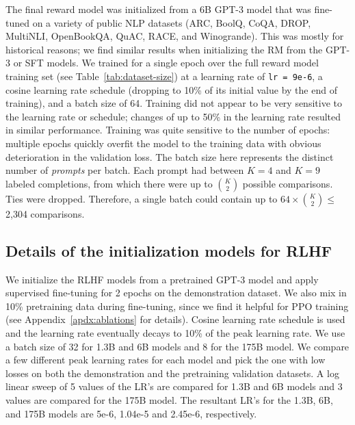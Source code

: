 The final reward model was initialized from a 6B GPT-3 model that was fine-tuned on a variety of public NLP datasets (ARC, BoolQ, CoQA, DROP, MultiNLI, OpenBookQA, QuAC, RACE, and Winogrande). This was mostly for historical reasons; we find similar results when initializing the RM from the GPT-3 or SFT models. We trained for a single epoch over the full reward model training set (see Table~\ref{tab:dataset-size}) at a learning rate of \texttt{lr = 9e-6}, a cosine learning rate schedule (dropping to 10\% of its initial value by the end of training), and a batch size of 64. Training did not appear to be very sensitive to the learning rate or schedule; changes of up to 50\% in the learning rate resulted in similar performance. Training was quite sensitive to the number of epochs: multiple epochs quickly overfit the model to the training data with obvious deterioration in the validation loss. The batch size here represents the distinct number of \emph{prompts} per batch. Each prompt had between $K=4$ and $K=9$ labeled completions, from which there were up to $K \choose 2$ possible comparisons. Ties were dropped. Therefore, a single batch could contain up to $64 \times {K \choose 2} \leq$ 2,304 comparisons.

\subsection{Details of the initialization models for RLHF}
We initialize the RLHF models from a pretrained GPT-3 model and apply supervised fine-tuning for 2 epochs on the demonstration dataset.  We also mix in 10\% pretraining data during fine-tuning, since we find it helpful for PPO training (see Appendix~\ref{apdx:ablations} for details). Cosine learning rate schedule is used and the learning rate eventually decays to 10\% of the peak learning rate. We use a batch size of 32 for 1.3B and 6B models and 8 for the 175B model. We compare a few different peak learning rates for each model and pick the one with low losses on both the demonstration and the pretraining validation datasets. A log linear sweep of 5 values of the LR's are compared for 1.3B and 6B models and 3 values are compared for the 175B model. The resultant LR's for the 1.3B, 6B, and 175B models are 5e-6, 1.04e-5 and 2.45e-6, respectively.


